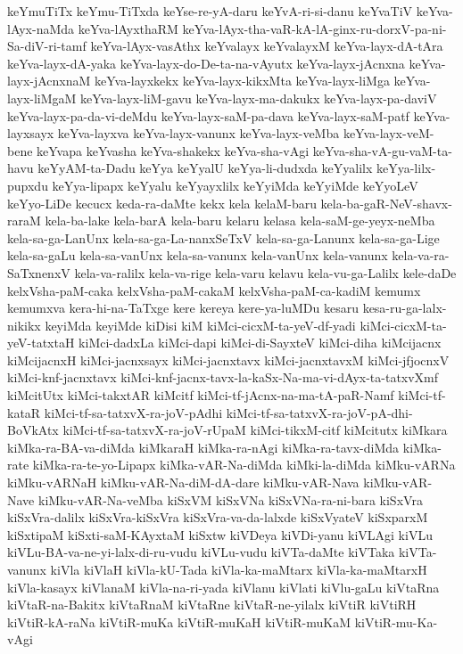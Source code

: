 {keYmuTiTx
keYmu-TiTxda
keYse-re-yA-daru
keYvA-ri-si-danu
keYvaTiV
keYva-lAyx-naMda
keYva-lAyxthaRM
keYva-lAyx-tha-vaR-kA-lA-ginx-ru-dorxV-pa-ni-Sa-diV-ri-tamf
keYva-lAyx-vasAthx
keYvalayx
keYvalayxM
keYva-layx-dA-tAra
keYva-layx-dA-yaka
keYva-layx-do-De-ta-na-vAyutx
keYva-layx-jAcnxna
keYva-layx-jAcnxnaM
keYva-layxkekx
keYva-layx-kikxMta
keYva-layx-liMga
keYva-layx-liMgaM
keYva-layx-liM-gavu
keYva-layx-ma-dakukx
keYva-layx-pa-daviV
keYva-layx-pa-da-vi-deMdu
keYva-layx-saM-pa-dava
keYva-layx-saM-patf
keYva-layxsayx
keYva-layxva
keYva-layx-vanunx
keYva-layx-veMba
keYva-layx-veM-bene
keYvapa
keYvasha
keYva-shakekx
keYva-sha-vAgi
keYva-sha-vA-gu-vaM-ta-havu
keYyAM-ta-Dadu
keYya
keYyalU
keYya-li-dudxda
keYyalilx
keYya-lilx-pupxdu
keYya-lipapx
keYyalu
keYyayxlilx
keYyiMda
keYyiMde
keYyoLeV
keYyo-LiDe
kecucx
keda-ra-daMte
kekx
kela
kelaM-baru
kela-ba-gaR-NeV-shavx-raraM
kela-ba-lake
kela-barA
kela-baru
kelaru
kelasa
kela-saM-ge-yeyx-neMba
kela-sa-ga-LanUnx
kela-sa-ga-La-nanxSeTxV
kela-sa-ga-Lanunx
kela-sa-ga-Lige
kela-sa-gaLu
kela-sa-vanUnx
kela-sa-vanunx
kela-vanUnx
kela-vanunx
kela-va-ra-SaTxnenxV
kela-va-ralilx
kela-va-rige
kela-varu
kelavu
kela-vu-ga-Lalilx
kele-daDe
kelxVsha-paM-caka
kelxVsha-paM-cakaM
kelxVsha-paM-ca-kadiM
kemumx
kemumxva
kera-hi-na-TaTxge
kere
kereya
kere-ya-luMDu
kesaru
kesa-ru-ga-lalx-nikikx
keyiMda
keyiMde
kiDisi
kiM
kiMci-cicxM-ta-yeV-df-yadi
kiMci-cicxM-ta-yeV-tatxtaH
kiMci-dadxLa
kiMci-dapi
kiMci-di-SayxteV
kiMci-diha
kiMcijacnx
kiMcijacnxH
kiMci-jacnxsayx
kiMci-jacnxtavx
kiMci-jacnxtavxM
kiMci-jfjocnxV
kiMci-knf-jacnxtavx
kiMci-knf-jacnx-tavx-la-kaSx-Na-ma-vi-dAyx-ta-tatxvXmf
kiMcitUtx
kiMci-takxtAR
kiMcitf
kiMci-tf-jAcnx-na-ma-tA-paR-Namf
kiMci-tf-kataR
kiMci-tf-sa-tatxvX-ra-joV-pAdhi
kiMci-tf-sa-tatxvX-ra-joV-pA-dhi-BoVkAtx
kiMci-tf-sa-tatxvX-ra-joV-rUpaM
kiMci-tikxM-citf
kiMcitutx
kiMkara
kiMka-ra-BA-va-diMda
kiMkaraH
kiMka-ra-nAgi
kiMka-ra-tavx-diMda
kiMka-rate
kiMka-ra-te-yo-Lipapx
kiMka-vAR-Na-diMda
kiMki-la-diMda
kiMku-vARNa
kiMku-vARNaH
kiMku-vAR-Na-diM-dA-dare
kiMku-vAR-Nava
kiMku-vAR-Nave
kiMku-vAR-Na-veMba
kiSxVM
kiSxVNa
kiSxVNa-ra-ni-bara
kiSxVra
kiSxVra-dalilx
kiSxVra-kiSxVra
kiSxVra-va-da-lalxde
kiSxVyateV
kiSxparxM
kiSxtipaM
kiSxti-saM-KAyxtaM
kiSxtw
kiVDeya
kiVDi-yanu
kiVLAgi
kiVLu
kiVLu-BA-va-ne-yi-lalx-di-ru-vudu
kiVLu-vudu
kiVTa-daMte
kiVTaka
kiVTa-vanunx
kiVla
kiVlaH
kiVla-kU-Tada
kiVla-ka-maMtarx
kiVla-ka-maMtarxH
kiVla-kasayx
kiVlanaM
kiVla-na-ri-yada
kiVlanu
kiVlati
kiVlu-gaLu
kiVtaRna
kiVtaR-na-Bakitx
kiVtaRnaM
kiVtaRne
kiVtaR-ne-yilalx
kiVtiR
kiVtiRH
kiVtiR-kA-raNa
kiVtiR-muKa
kiVtiR-muKaH
kiVtiR-muKaM
kiVtiR-mu-Ka-vAgi
}
